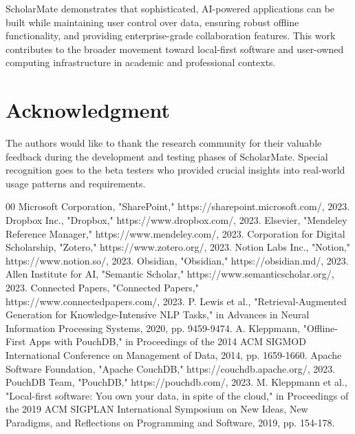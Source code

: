 \documentclass[conference]{IEEEtran}
\begin{document}
ScholarMate demonstrates that sophisticated, AI-powered applications can be built while maintaining user control over data, ensuring robust offline functionality, and providing enterprise-grade collaboration features. This work contributes to the broader movement toward local-first software and user-owned computing infrastructure in academic and professional contexts.

\section*{Acknowledgment}

The authors would like to thank the research community for their valuable feedback during the development and testing phases of ScholarMate. Special recognition goes to the beta testers who provided crucial insights into real-world usage patterns and requirements.

\begin{thebibliography}{00}
 Microsoft Corporation, "SharePoint," https://sharepoint.microsoft.com/, 2023.
 Dropbox Inc., "Dropbox," https://www.dropbox.com/, 2023.
 Elsevier, "Mendeley Reference Manager," https://www.mendeley.com/, 2023.
 Corporation for Digital Scholarship, "Zotero," https://www.zotero.org/, 2023.
 Notion Labs Inc., "Notion," https://www.notion.so/, 2023.
 Obsidian, "Obsidian," https://obsidian.md/, 2023.
 Allen Institute for AI, "Semantic Scholar," https://www.semanticscholar.org/, 2023.
 Connected Papers, "Connected Papers," https://www.connectedpapers.com/, 2023.
 P. Lewis et al., "Retrieval-Augmented Generation for Knowledge-Intensive NLP Tasks," in Advances in Neural Information Processing Systems, 2020, pp. 9459-9474.
 A. Kleppmann, "Offline-First Apps with PouchDB," in Proceedings of the 2014 ACM SIGMOD International Conference on Management of Data, 2014, pp. 1659-1660.
 Apache Software Foundation, "Apache CouchDB," https://couchdb.apache.org/, 2023.
 PouchDB Team, "PouchDB," https://pouchdb.com/, 2023.
 M. Kleppmann et al., "Local-first software: You own your data, in spite of the cloud," in Proceedings of the 2019 ACM SIGPLAN International Symposium on New Ideas, New Paradigms, and Reflections on Programming and Software, 2019, pp. 154-178.
\end{thebibliography}
\end{document}
